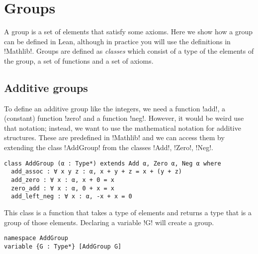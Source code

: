 
\section{Groups}

A group is a set of elements that satisfy some axioms. Here we show how a group can be defined in Lean, although in practice you will use the definitions in !Mathlib!. Groups are defined as \emph{classes} which consist of a type of the elements of the group, a set of functions and a set of axioms. 

\subsection{Additive groups}

To define an additive group like the integers, we need a function !add!, a (constant) function !zero! and a function !neg!. However, it would be weird use that notation; instead, we want to use the mathematical notation for additive structures. These are predefined in !Mathlib! and we can access them by extending the class !AddGroup! from the classes !Add!, !Zero!, !Neg!.
\begin{Verbatim}
class AddGroup (α : Type*) extends Add α, Zero α, Neg α where
  add_assoc : ∀ x y z : α, x + y + z = x + (y + z)
  add_zero : ∀ x : α, x + 0 = x
  zero_add : ∀ x : α, 0 + x = x
  add_left_neg : ∀ x : α, -x + x = 0
\end{Verbatim}



This class is a function that takes a type of elements and returns a type that is a group of those elements. Declaring a variable !G! will create a group.

\begin{Verbatim}[firstnumber=last]
namespace AddGroup
variable {G : Type*} [AddGroup G]
\end{Verbatim}

